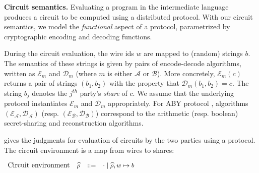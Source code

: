 \noindent\textbf{Circuit semantics.} Evaluating a program in the
intermediate language produces a
circuit to be computed using a distributed \mpc protocol. With
our circuit semantics, we model the \emph{functional} aspect
of a \mpc protocol, parametrized by cryptographic encoding and
decoding functions.

During the circuit evaluation, the wire ids $w$ are
mapped to (random) strings $b$. The semantics of these strings is
given by pairs of encode-decode algorithms, written as
$\mathcal{E}_{m}$ and $\mathcal{D}_{m}$ (where $m$ is either
$\mathcal{A}$ or $\mathcal{B}$). 
More concretely,
$\mathcal{E}_{m}(c)$ returns a pair of strings $(b_{1}, b_{2})$
 with the property that
$\mathcal{D}_{m}(b_{1}, b_{2}) = c$. 
The string $b_j$ denotes the $j^{th}$ party's {\it share} of $c$.
We assume that the underlying \mpc
protocol instantiates $\mathcal{E}_{m}$ and $\mathcal{D}_{m}$
appropriately. For ABY protocol \cite{aby}, algorithms
$(\mathcal{E}_{\mathcal{A}},\mathcal{D}_{\mathcal{A}})$
(resp. $(\mathcal{E}_{\mathcal{B}},\mathcal{D}_{\mathcal{B}})$)
correspond to the arithmetic (resp. boolean) secret-sharing and
reconstruction algorithms.


 gives the judgments for evaluation of circuits by
the two parties using a \mpc protocol. The circuit environment  is a
map from wires to shares:

\vspace{0.2cm}
$
\footnotesize
\begin{array}{rrcl}
    \ftext{Circuit environment} & \widehat\rho &::=& \cdot \mid \widehat\rho,\wire \mapsto b\\
\end{array}
$
\vspace{0.2cm}

